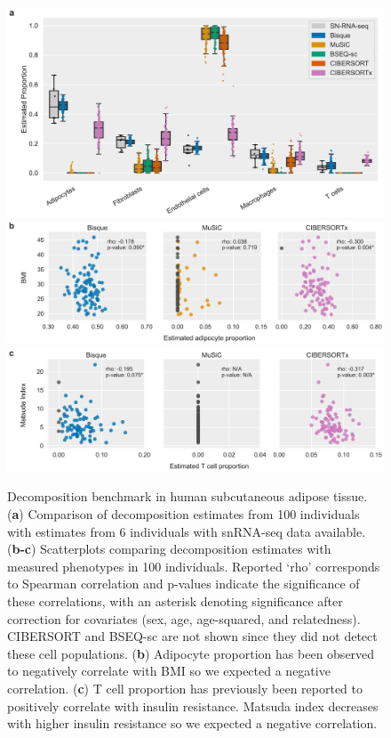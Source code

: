 \begin{figure}
\centering
\includegraphics[scale=\figscale]{chapter2/figures/fig3a.pdf}
\includegraphics[scale=\figscale]{chapter2/figures/fig3b.pdf}
\includegraphics[scale=\figscale]{chapter2/figures/fig3c.pdf}
\caption{
         Decomposition benchmark in human subcutaneous adipose tissue.
         (\textbf{a}) Comparison of decomposition estimates from 100 individuals with estimates from 6 individuals with snRNA-seq data available. 
         (\textbf{b-c}) Scatterplots comparing decomposition estimates with measured phenotypes in 100 individuals. Reported ‘rho’ corresponds to Spearman correlation and p-values indicate the significance of these correlations, with an asterisk denoting significance after correction for covariates (sex, age, age-squared, and relatedness). CIBERSORT and BSEQ-sc are not shown since they did not detect these cell populations.
         (\textbf{b}) Adipocyte proportion has been observed to negatively correlate with BMI so we expected a negative correlation.
         (\textbf{c}) T cell proportion has previously been reported to positively correlate with insulin resistance. Matsuda index decreases with higher insulin resistance so we expected a negative correlation.
        }
\label{fig:fig2.3}
\end{figure}

